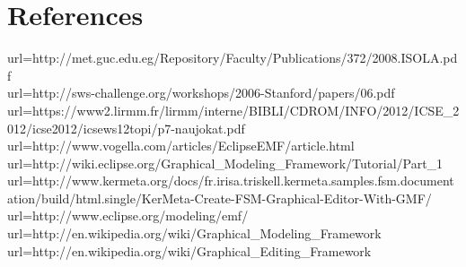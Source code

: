 \documentclass[a4paper]{article}
\begin{document}
\newpage
\section{References}

url={http://met.guc.edu.eg/Repository/Faculty/Publications/372/2008.ISOLA.pdf}\\
url={http://sws-challenge.org/workshops/2006-Stanford/papers/06.pdf}\\
url={https://www2.lirmm.fr/lirmm/interne/BIBLI/CDROM/INFO/2012/ICSE_2012/icse2012/icsews12topi/p7-naujokat.pdf}
url={http://www.vogella.com/articles/EclipseEMF/article.html}\\
url={http://wiki.eclipse.org/Graphical_Modeling_Framework/Tutorial/Part_1}\\
url={http://www.kermeta.org/docs/fr.irisa.triskell.kermeta.samples.fsm.documentation/build/html.single/KerMeta-Create-FSM-Graphical-Editor-With-GMF/}\\
url={http://www.eclipse.org/modeling/emf/}\\
url={http://en.wikipedia.org/wiki/Graphical_Modeling_Framework}\\
url={http://en.wikipedia.org/wiki/Graphical_Editing_Framework}\\
\end{document}
